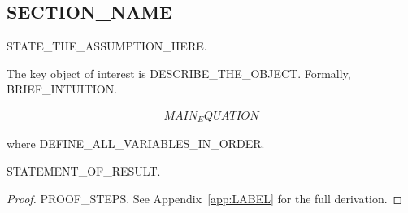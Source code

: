 %

\subsection{SECTION_NAME}

\begin{assumption}
STATE_THE_ASSUMPTION_HERE.
\end{assumption}

The key object of interest is DESCRIBE_THE_OBJECT. Formally, BRIEF_INTUITION.

\begin{align}
    MAIN_EQUATION \label{eq:LABEL}
\end{align}

where DEFINE_ALL_VARIABLES_IN_ORDER.

\begin{proposition}\label{prop:LABEL}
STATEMENT_OF_RESULT.
\end{proposition}

\begin{proof}
PROOF_STEPS. See Appendix~\ref{app:LABEL} for the full derivation.
\end{proof}

